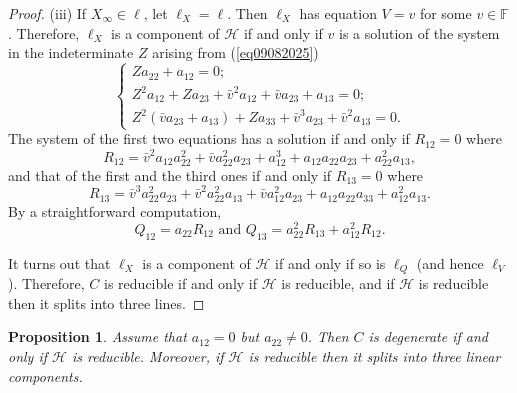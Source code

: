 \documentclass[sn-mathphys-num]{sn-jnl}%
\newtheorem{proposition}[theorem]{Proposition}
\begin{document}
\begin{proof}
(iii) If $X_\infty\in \ell$, let $\ell_X=\ell$. Then $\ell_X$ has equation $V=v$ for some $v\in \mathbb{F}$. Therefore, $\ell_X$ is a component of $\mathcal{H}$ if and only if $v$ is a solution of the system in the indeterminate $Z$ arising from (\ref{eq09082025})
\begin{equation*}
\label{eq09082025C}
\begin{cases}Za_{22}+a_{12}=0; \\
Z^2a_{12}+Za_{23}+\bar{v}^2a_{12}+\bar{v}a_{23}+a_{13}=0;\\
Z^2(\bar{v}a_{23}+a_{13})+Za_{33}+\bar{v}^3a_{23}+\bar{v}^2a_{13}=0.
\end{cases}
\end{equation*}
The system of the first two equations has a solution if and only if
$R_{12}=0$ where
\begin{equation*}
\label{eq12082025D}
R_{12}=\bar{v}^2 a_{12}a_{22}^2+\bar{v}a_{22}^2a_{23}+a_{12}^3+a_{12}a_{22}a_{23}+a_{22}^2a_{13},
\end{equation*}
and that of the first and the third ones if and only if $R_{13}=0$ where
\begin{equation*}
\label{eq12082025DD}
R_{13}=\bar{v}^3 a_{22}^2a_{23}+\bar{v}^2a_{22}^2a_{13}+\bar{v}a_{12}^2a_{23}+a_{12}a_{22}a_{33}+a_{12}^2a_{13}.
\end{equation*}
By a straightforward computation,
$${\mbox{$Q_{12}=a_{22}R_{12}$ and $Q_{13}=a_{22}^2R_{13}+a_{12}^2R_{12}$}}.$$

It turns out that $\ell_X$ is a component of $\mathcal{H}$ if and only if so is $\ell_Q$ (and hence $\ell_V$). Therefore, $C$ is reducible if and only if $\mathcal{H}$ is reducible, and if $\mathcal{H}$ is reducible then it splits into three lines.
\end{proof}
\begin{proposition}
\label{pro12082025A} Assume that $a_{12}=0$ but $a_{22}\ne 0$. Then $C$ is degenerate if and only if $\mathcal{H}$ is reducible. Moreover, if $\mathcal{H}$ is reducible then it splits into three linear components.
\end{proposition}
\end{document}
